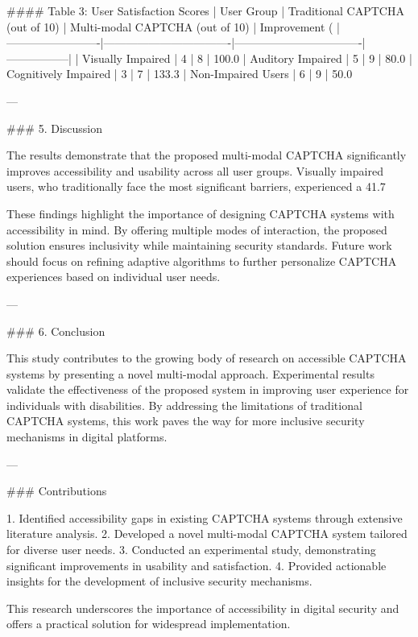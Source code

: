 #### Table 3: User Satisfaction Scores  
| User Group             | Traditional CAPTCHA (out of 10) | Multi-modal CAPTCHA (out of 10) | Improvement (%
|-------------------------|----------------------------------|----------------------------------|-----------------|  
| Visually Impaired       | 4                              | 8                              | 100.0%
| Auditory Impaired       | 5                              | 9                              | 80.0%
| Cognitively Impaired    | 3                              | 7                              | 133.3%
| Non-Impaired Users      | 6                              | 9                              | 50.0%

---

### 5. Discussion  

The results demonstrate that the proposed multi-modal CAPTCHA significantly improves accessibility and usability across all user groups. Visually impaired users, who traditionally face the most significant barriers, experienced a 41.7%

These findings highlight the importance of designing CAPTCHA systems with accessibility in mind. By offering multiple modes of interaction, the proposed solution ensures inclusivity while maintaining security standards. Future work should focus on refining adaptive algorithms to further personalize CAPTCHA experiences based on individual user needs.

---

### 6. Conclusion  

This study contributes to the growing body of research on accessible CAPTCHA systems by presenting a novel multi-modal approach. Experimental results validate the effectiveness of the proposed system in improving user experience for individuals with disabilities. By addressing the limitations of traditional CAPTCHA systems, this work paves the way for more inclusive security mechanisms in digital platforms.

---

### Contributions  

1. Identified accessibility gaps in existing CAPTCHA systems through extensive literature analysis.  
2. Developed a novel multi-modal CAPTCHA system tailored for diverse user needs.  
3. Conducted an experimental study, demonstrating significant improvements in usability and satisfaction.  
4. Provided actionable insights for the development of inclusive security mechanisms.  

This research underscores the importance of accessibility in digital security and offers a practical solution for widespread implementation.